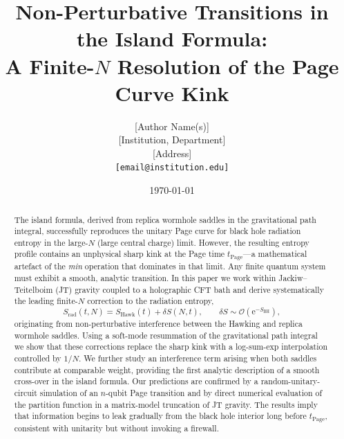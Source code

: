 \documentclass[12pt,a4paper]{article}
\newcommand{\Srad}{S_{\mathrm{rad}}}
\newcommand{\SBH}{S_{\mathrm{BH}}}
\newcommand{\SHawk}{S_{\mathrm{Hawk}}}
\newcommand{\dS}{\delta S}
\newcommand{\tPage}{t_{\mathrm{Page}}}
\newcommand{\OO}{\mathcal{O}}
\newcommand{\e}{\mathrm{e}}
\begin{document}

\title{\textbf{Non-Perturbative Transitions in the Island Formula:\\
A Finite-$N$ Resolution of the Page Curve Kink}}

\author{%
  [Author Name(s)]\\
  \small [Institution, Department]\\
  \small [Address]\\
  \small \texttt{[email@institution.edu]}
}

\date{\today}

\maketitle

\begin{abstract}
The island formula, derived from replica wormhole saddles in the gravitational
path integral, successfully reproduces the unitary Page curve for black hole
radiation entropy in the large-$N$ (large central charge) limit.  However,
the resulting entropy profile contains an unphysical sharp kink at the Page
time $\tPage$—a mathematical artefact of the \emph{min} operation that
dominates in that limit.  Any finite quantum system must exhibit a smooth,
analytic transition.  In this paper we work within Jackiw--Teitelboim (JT)
gravity coupled to a holographic CFT bath and derive systematically the
leading finite-$N$ correction to the radiation entropy,
\begin{equation*}
  \Srad(t,N) = \SHawk(t) + \dS(N,t),
  \qquad \dS \sim \OO\!\left(\e^{-\SBH}\right),
\end{equation*}
originating from non-perturbative interference between the Hawking and replica
wormhole saddles.  Using a soft-mode resummation of the gravitational path
integral we show that these corrections replace the sharp kink with a
log-sum-exp interpolation controlled by $1/N$.  We further study an
interference term arising when both saddles contribute at comparable weight,
providing the first analytic description of a smooth cross-over in the island
formula.  Our predictions are confirmed by a random-unitary-circuit simulation
of an $n$-qubit Page transition and by direct numerical evaluation of the
partition function in a matrix-model truncation of JT gravity.  The results
imply that information begins to leak gradually from the black hole interior
long before $\tPage$, consistent with unitarity but without invoking a
firewall.
\end{abstract}
\end{document}
